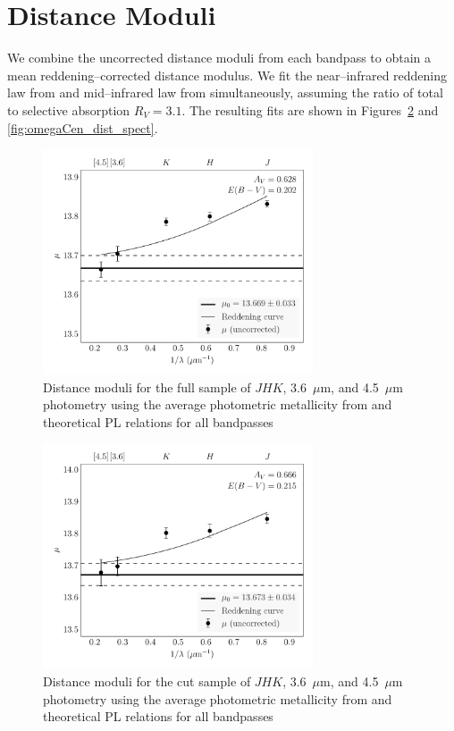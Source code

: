 \documentclass[a4paper,fleqn,usenatbib]{mnras}
\begin{document}
\section{Distance Moduli}
\label{sec:distance_moduli}

We combine the uncorrected distance moduli from each bandpass to obtain a mean reddening--corrected distance modulus. We fit the near--infrared reddening law from \citet{1989ApJ...345..245C} and mid--infrared law from \citet{2005ApJ...619..931I} simultaneously, assuming the ratio of total to selective absorption $R_V = 3.1$. The resulting fits are shown in Figures~\ref{fig:omegaCen_dist_phot} and \ref{fig:omegaCen_dist_spect}.

\begin{figure}
\begin{center}
\includegraphics[width=80mm]{final_plots/multiwavelength_distance_allstars_phot.pdf}
\caption{Distance moduli for the full sample of $J\!H\!K$, 3.6~$\mu$m, and 4.5~$\mu$m photometry using the average photometric metallicity from \citet{2000AJ....119.1824R} and theoretical PL relations for all bandpasses}
\label{fig:omegaCen_dist_phot_allstar}
\end{center}
\end{figure}

\begin{figure}
\begin{center}
\includegraphics[width=80mm]{final_plots/multiwavelength_distance_samestars_phot_unweighted.pdf}
\caption{Distance moduli for the cut sample of $J\!H\!K$, 3.6~$\mu$m, and 4.5~$\mu$m photometry using the average photometric metallicity from \citet{2000AJ....119.1824R} and theoretical PL relations for all bandpasses}
\label{fig:omegaCen_dist_phot}
\end{center}
\end{figure}
\end{document}
